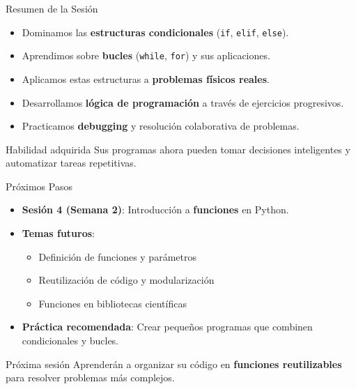 \documentclass[10pt]{beamer}
\begin{document}
\begin{frame}{Resumen de la Sesión}
  \begin{itemize}
    \item Dominamos las \textbf{estructuras condicionales} (\texttt{if}, \texttt{elif}, \texttt{else}).
    \item Aprendimos sobre \textbf{bucles} (\texttt{while}, \texttt{for}) y sus aplicaciones.
    \item Aplicamos estas estructuras a \textbf{problemas físicos reales}.
    \item Desarrollamos \textbf{lógica de programación} a través de ejercicios progresivos.
    \item Practicamos \textbf{debugging} y resolución colaborativa de problemas.
  \end{itemize}
  
  \begin{block}{Habilidad adquirida}
    Sus programas ahora pueden tomar decisiones inteligentes y automatizar tareas repetitivas.
  \end{block}
\end{frame}

\begin{frame}{Próximos Pasos}
  \begin{itemize}
    \item \textbf{Sesión 4 (Semana 2)}: Introducción a \textbf{funciones} en Python.
    \item \textbf{Temas futuros}:
      \begin{itemize}
        \item Definición de funciones y parámetros
        \item Reutilización de código y modularización
        \item Funciones en bibliotecas científicas
      \end{itemize}
    \item \textbf{Práctica recomendada}: Crear pequeños programas que combinen condicionales y bucles.
  \end{itemize}
  
  \begin{block}{Próxima sesión}
    Aprenderán a organizar su código en \textbf{funciones reutilizables} para resolver problemas más complejos.
  \end{block}
\end{frame}
\end{document}
